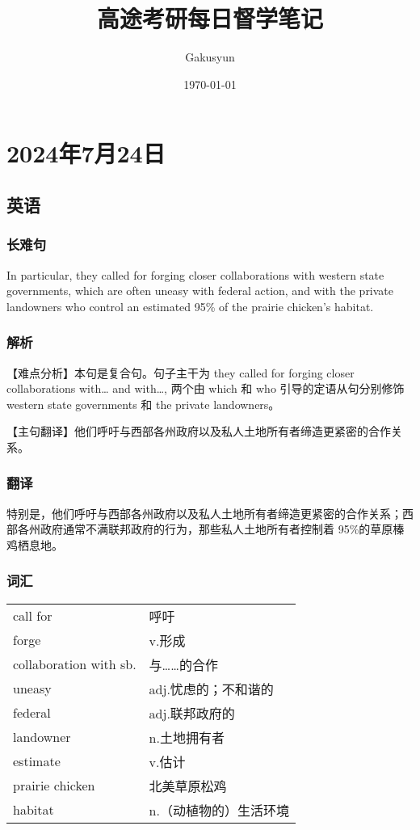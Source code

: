 \documentclass[UTF8]{ctexart}
\title{高途考研每日督学笔记}
\author{Gakusyun}
\date{\today}
\begin{document}
\maketitle
\thispagestyle{empty}
\newpage
{}
\setcounter{page}{1}
\tableofcontents
\newpage
{}
\setcounter{page}{1}
\section{2024年7月24日}
\subsection{英语}
\subsubsection{长难句}
In particular, they called for forging closer collaborations with western state
governments, which are often uneasy with federal action, and with the private
landowners who control an estimated 95\% of the prairie chicken's habitat.
\subsubsection{解析}
【难点分析】本句是复合句。句子主干为 they called for forging closer
collaborations with… and with…, 两个由 which 和 who 引导的定语从句分别修饰western state governments 和 the private landowners。

【主句翻译】他们呼吁与西部各州政府以及私人土地所有者缔造更紧密的合作关系。
\subsubsection{翻译}
特别是，他们呼吁与西部各州政府以及私人土地所有者缔造更紧密的合作关系；西部各州政府通常不满联邦政府的行为，那些私人土地所有者控制着 95\%的草原榛鸡栖息地。
\subsubsection{词汇}

\begin{table}[h]
      \centering
      \begin{tabular}{p{}p{}}
            call for               & 呼吁           \\
            forge                  & v.形成         \\
            collaboration with sb. & 与……的合作       \\
            uneasy                 & adj.忧虑的；不和谐的 \\
            federal                & adj.联邦政府的    \\
            landowner              & n.土地拥有者      \\
            estimate               & v.估计         \\
            prairie chicken        & 北美草原松鸡       \\
            habitat                & n.（动植物的）生活环境
      \end{tabular}
\end{table}
\end{document}
